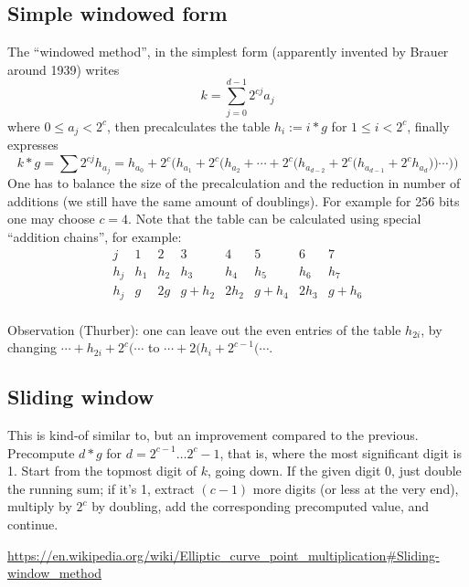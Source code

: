 \documentclass[12pt,draft,a4paper,openany,oneside]{amsbook}
\theoremstyle{plain}
\theoremstyle{definition}
\begin{document}

\subsection{Simple windowed form}
The ``windowed method'', in the simplest form (apparently invented by Brauer around 1939)
writes 
\[ k = \sum_{j=0}^{d-1} 2^{cj} a_j \]
where $0\le a_j < 2^c$, then precalculates the table $h_{i}:=i*g$ for
$1\le i < 2^c$, finally expresses
\[ k*g = \sum 2^{cj} h_{a_j} = h_{a_0} + 2^c\Big( h_{a_1} + 2^c\Big(h_{a_2} + \cdots + 2^c\Big( h_{a_{d-2}} + 2^c\Big(h_{a_{d-1}} + 2^c h_{a_d} \Big)\Big)\cdots \Big)\Big) \]
One has to balance the size of the precalculation and the reduction in number of additions
(we still have the same amount of doublings). For example for 256 bits one may choose
$c=4$. Note that the table can be calculated using special ``addition chains'',
for example:
\[\begin{array}{c|ccccccc}
j   &   1 &   2 &   3 &   4 &   5 &   6 &   7 \\ \hline
h_j & h_1 & h_2 & h_3 & h_4 & h_5 & h_6 & h_7 \\
h_j & g & 2g & g+h_2 & 2h_2 & g+h_4 & 2h_3 & g+h_6\\
\end{array}
\]

Observation (Thurber): one can leave out the even entries of the table $h_{2i}$,
by changing $\cdots+h_{2i}+2^c(\cdots$ to $\cdots+2(h_{i}+2^{c-1}(\cdots$.


\subsection{Sliding window}
This is kind-of similar to, but an improvement compared to the previous.
Precompute $d*g$ for $d=2^{c-1}\dots 2^c-1$, that is, where the most significant digit is 1.
Start from the topmost digit of $k$, going down. If the given digit 0, just double
the running sum; if it's 1, extract $(c-1)$ more digits (or less at the very end),
multiply by $2^c$ by doubling, add the corresponding precomputed value, and continue.

\url{https://en.wikipedia.org/wiki/Elliptic_curve_point_multiplication#Sliding-window_method}

\end{document}

